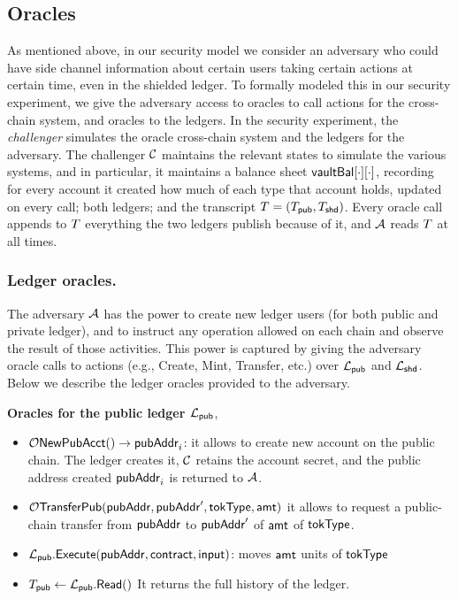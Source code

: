 \subsection{Oracles}
\label{ssec:oracles}
As mentioned above, in our security model we consider an adversary who could have side channel information about certain users taking certain actions at certain time, even in the shielded ledger.
To formally modeled this in our security experiment, we give the adversary access to oracles to call actions for the cross-chain system, and oracles to the ledgers.
In the security experiment,  the \emph{challenger} simulates the oracle cross-chain system and the ledgers  for the adversary.
The challenger $\mathcal{C}$ maintains the relevant states to simulate the various systems,  and in particular, it maintains a balance sheet $\mathsf{vaultBal}[\cdot][\cdot]$, recording for every account
it created how much of each type that account holds, updated on every call; both ledgers; and the
transcript $T = (T_{\mathsf{pub}}, T_{\mathsf{shd}})$. Every oracle call appends to $T$ everything the two
ledgers publish because of it, and $\mathcal{A}$ reads $T$ at all times.

\medskip
\subsubsection{Ledger oracles.}
\label{sec:ledgeroracles}
The adversary $\mathcal{A}$  has the power to create new ledger users (for both public and private ledger), and to instruct any operation allowed on each chain and observe the result of those activities.
This power is captured by giving the adversary oracle calls to
actions  (e.g., Create, Mint, Transfer, etc.)  over $\mathcal{L}_{\mathsf{pub}}$ and $\mathcal{L}_{\mathsf{shd}}$.
Below we describe the ledger oracles provided to the adversary.


\medskip
\noindent\textbf{Oracles for the public ledger $\mathcal{L}_{\mathsf{pub}}$},
\begin{itemize}[leftmargin=1.4em,itemsep=3pt]
\item $\mathcal{O}\mathsf{NewPubAcct}() \to \mathsf{pubAddr}_i$: it allows to create new account on the public chain. The ledger
      creates it, $\mathcal{C}$ retains the account secret, and the public address created $\mathsf{pubAddr}_i$ is returned to $\mathcal{A}$.

\item $\mathcal{O}\mathsf{TransferPub}(\mathsf{pubAddr}, \mathsf{pubAddr}', \mathsf{tokType}, \mathsf{amt})$ it allows to request a  public-chain transfer from  $\mathsf{pubAddr}$ to  $\mathsf{pubAddr}'$ of $\mathsf{amt}$ of $\mathsf{tokType}$.
 \item $\mathcal{L}_{\mathsf{pub}}.\mathsf{Execute}(\mathsf{pubAddr}, \mathsf{contract}, \mathsf{input})$: moves $\mathsf{amt}$ units of $\mathsf{tokType}$
\item $T_{\mathsf{pub}} \gets \mathcal{L}_{\mathsf{pub}}.\mathsf{Read}()$ It returns the full history of the ledger.
\end{itemize}

